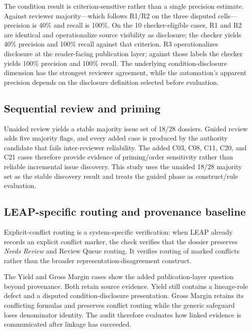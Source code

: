 \documentclass[a4paper,fleqn]{cas-dc}
\begin{document}
The condition result is criterion-sensitive rather than a single precision estimate. Against reviewer majority---which follows R1/R2 on the three disputed cells---precision is 40\% and recall is 100\%. On the 10 checker-eligible cases, R1 and R2 are identical and operationalize source visibility as disclosure; the checker yields 40\% precision and 100\% recall against that criterion. R3 operationalizes disclosure at the reader-facing publication layer; against those labels the checker yields 100\% precision and 100\% recall. The underlying condition-disclosure dimension has the strongest reviewer agreement, while the automation's apparent precision depends on the disclosure definition selected before evaluation.

\subsection{Sequential review and priming}
Unaided review yields a stable majority issue set of 18/28 dossiers. Guided review adds five majority flags, and every added case is produced by the authority candidate that fails inter-reviewer reliability. The added C03, C08, C11, C20, and C21 cases therefore provide evidence of priming/order sensitivity rather than reliable incremental issue discovery. This study uses the unaided 18/28 majority set as the stable discovery result and treats the guided phase as construct/rule evaluation.

\subsection{LEAP-specific routing and provenance baseline}
Explicit-conflict routing is a system-specific verification: when LEAP already records an explicit conflict marker, the check verifies that the dossier preserves \emph{Needs Review} and Review Queue routing. It verifies routing of marked conflicts rather than the broader representation-disagreement construct.

The Yield and Gross Margin cases show the added publication-layer question beyond provenance. Both retain source evidence. Yield still contains a lineage-role defect and a disputed condition-disclosure presentation. Gross Margin retains its conflicting formulas and preserves conflict routing while the generic safeguard loses denominator identity. The audit therefore evaluates how linked evidence is communicated after linkage has succeeded.
\end{document}
